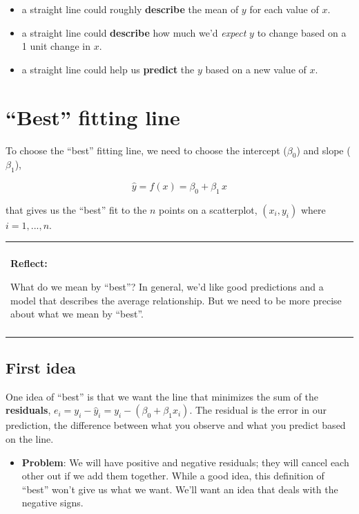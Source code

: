 \documentclass[]{book}
\providecommand{\tightlist}{%
  \setlength{\itemsep}{0pt}\setlength{\parskip}{0pt}}
\newenvironment{reflect}
{
    \begin{center}
    
    \begin{tabular}{|p{0.8\textwidth}|}
    \rowcolor{LightBlue}
    \hline\\
    \rowcolor{LightBlue}
    \textbf{Reflect:}
}
{
    \\\rowcolor{LightBlue}
    \\\hline
    \end{tabular} 
    \end{center}
}
\begin{document}
\begin{itemize}
\tightlist
\item
  a straight line could roughly \textbf{describe} the mean of \(y\) for each value of \(x\).
\item
  a straight line could \textbf{describe} how much we'd \emph{expect} \(y\) to change based on a 1 unit change in \(x\).
\item
  a straight line could help us \textbf{predict} the \(y\) based on a new value of \(x\).
\end{itemize}

\hypertarget{best-fitting-line}{%
\section{``Best'' fitting line}\label{best-fitting-line}}

To choose the ``best'' fitting line, we need to choose the intercept (\(\beta_0\)) and slope (\(\beta_1\)),

\[ \hat{y} = f(x) = \beta_0 + \beta_1\,x \]

that gives us the ``best'' fit to the \(n\) points on a scatterplot, \((x_i,y_i)\) where \(i=1,...,n\).

\begin{reflect}
What do we mean by ``best''? In general, we'd like good predictions and
a model that describes the average relationship. But we need to be more
precise about what we mean by ``best''.
\end{reflect}

\hypertarget{first-idea}{%
\subsection{First idea}\label{first-idea}}

One idea of ``best'' is that we want the line that minimizes the sum of the \textbf{residuals}, \(e_i = y_i - \hat{y}_i = y_i - ( \beta_0 + \beta_1x_i)\). The residual is the error in our prediction, the difference between what you observe and what you predict based on the line.

\begin{itemize}
\tightlist
\item
  \textbf{Problem}: We will have positive and negative residuals; they will cancel each other out if we add them together. While a good idea, this definition of ``best'' won't give us what we want. We'll want an idea that deals with the negative signs.
\end{itemize}
\end{document}
